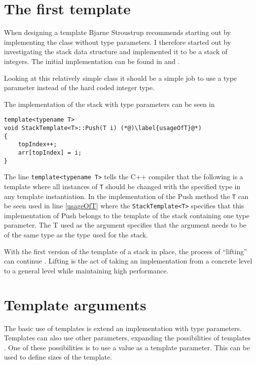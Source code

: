 \section{The first template}
When designing a template Bjarne Stroustrup recommends starting out by implementing the class without type parameters\cite[p.~670]{stroustrup2013c++}. 
I therefore started out by investigating the stack data structure and implemented it to be a stack of integers.
The initial implementation can be found in  and .

Looking at this relatively simple class it should be a simple job to use a type parameter instead of the hard coded integer type.

The implementation of the stack with type parameters can be seen in 

\begin{lstlisting}
template<typename T>
void StackTemplate<T>::Push(T i) (*@)\label{usageOfT}@*)
{
	topIndex++;
	arr[topIndex] = i;
}
\end{lstlisting}

The line \lstinline|template<typename T>| tells the C++ compiler that the following is a template where all instances of \texttt{T} should be changed with the specified type in any template instantiation.
In the implementation of the Push method the \texttt{T} can be seen used in line \ref{usageOfT} where the \lstinline|StackTemplate<T>| specifies that this implementation of Push belongs to the template of the stack containing one type parameter.
The T used as the argument specifies that the argument needs to be of the same type as the type used for the stack. 

With the first version of the template of a stack in place, the process of ``lifting'' can continue . 
Lifting is the act of taking an implementation from a concrete level to a general level while maintaining high performance\cite[p.~700]{stroustrup2013c++}.

\section{Template arguments}
The basic use of templates is extend an implementation with type parameters.
Templates can also use other parameters, expanding the possibilities of templates \cite[p.~722]{stroustrup2013c++}.
One of these possibilities is to use a value as a template parameter.
This can be used to define sizes of the template. \cite[p.~724]{stroustrup2013c++}

